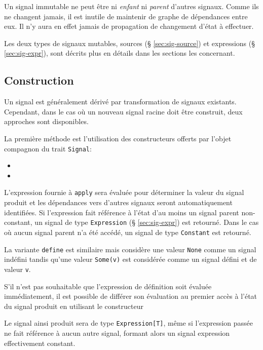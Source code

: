Un signal immutable ne peut être ni \emph{enfant} ni \emph{parent} d'autres signaux. Comme ils ne changent jamais, il est inutile de maintenir de graphe de dépendances entre eux. Il n'y aura en effet jamais de propagation de changement d'état à effectuer.

Les deux types de signaux mutables, sources (§ \ref{sec:sig-source}) et expressions (§ \ref{sec:sig-expr}), sont décrits plus en détails dans les sections les concernant.

\subsection{Construction}
Un signal est généralement dérivé par transformation de signaux existants. Cependant, dans le cas où un nouveau signal racine doit être construit, deux approches sont disponibles.

La première méthode est l'utilisation des constructeurs offerts par l'objet compagnon du trait \texttt{Signal}:

\begin{itemize}
	\item {}
	\item {}
\end{itemize}

L'expression fournie à \texttt{apply} sera évaluée pour déterminer la valeur du signal produit et les dépendances vers d'autres signaux seront automatiquement identifiées. Si l'expression fait référence à l'état d'au moins un signal parent non-constant, un signal de type \texttt{Expression} (§ \ref{sec:sig-expr}) est retourné. Dans le cas où aucun signal parent n'a été accédé, un signal de type \texttt{Constant} est retourné.

La variante \texttt{define} est similaire mais considère une valeur \texttt{None} comme un signal indéfini tandis qu'une valeur \texttt{Some(v)} est considérée comme un signal défini et de valeur \texttt{v}. 

S'il n'est pas souhaitable que l'expression de définition soit évaluée immédiatement, il est possible de différer son évaluation au premier accès à l'état du signal produit en utilisant le constructeur
\begin{center}
\end{center}
Le signal ainsi produit sera de type \texttt{Expression[T]}, même si l'expression passée ne fait référence à aucun autre signal, formant alors un signal expression effectivement constant.

